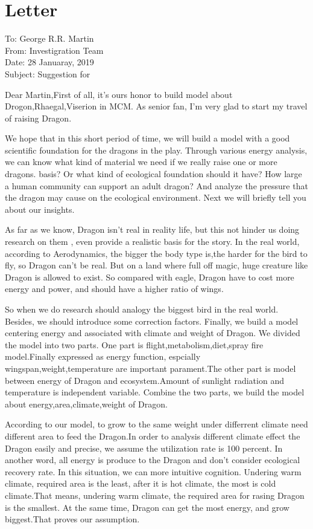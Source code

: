 \documentclass[12pt]{article}
\begin{document}
\section{Letter}

\begin{flushleft}
To: George R.R. Martin\\ 
From: Investigration Team\\
Date: 28 Januaray, 2019\\
Subject: Suggestion for\\
\end{flushleft}

Dear Martin,First of all, it's ours honor to build model about Drogon,Rhaegal,Viserion in MCM. As senior fan, I'm very glad to start my travel of raising Dragon.

We hope that in this short period of time, we will build a model with a good scientific foundation for the dragons in the play. Through various energy analysis, we can know what kind of material we need if we really raise one or more dragons. basis? Or what kind of ecological foundation should it have? How large a human community can support an adult dragon? And analyze the pressure that the dragon may cause on the ecological environment. Next we will briefly tell you about our insights.

As far as we know, Dragon isn't real in reality life, but this not hinder us doing research on them , even provide a realistic basis for the story.  In the real world, according to Aerodynamics, the bigger the body type is,the harder for the bird to fly, so Dragon can't be real. But on a land where full off magic, huge creature like Dragon is allowed to exist. So compared with eagle, Dragon have to cost more energy and power, and should have a higher ratio of wings.

So when we do research should analogy the biggest bird in the real world. Besides, we should introduce some correction factors. Finally, we build a model centering energy and associated with climate and weight of Dragon. We divided the model into two parts. One part is flight,metabolism,diet,spray fire model.Finally expressed as energy function, espcially wingspan,weight,temperature are important parament.The other part is model between energy of Dragon and ecosystem.Amount of sunlight radiation and temperature is independent variable. Combine the two parts, we build the model about energy,area,climate,weight of Dragon.

According to our model, to grow to the same weight under differrent climate need different area to feed the Dragon.In order to analysis different climate effect the Dragon easily and precise, we assume the utilization rate is 100 percent. In another word, all energy is produce to the Dragon and don't consider ecological recovery rate. In this situation, we can more intuitive cognition. Undering warm climate, required area is the least, after it is hot climate, the most is cold climate.That means, undering warm climate, the required area for rasing Dragon is the smallest. At the same time, Dragon can get the most energy, and grow biggest.That proves our assumption.
\end{document}
